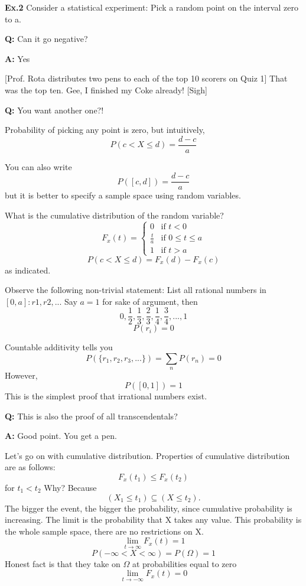 {\bf Ex.2}
Consider a statistical experiment: Pick a random point on the interval
zero to a.

{\bf Q:} Can it go negative?

{\bf A:} Yes

[Prof. Rota distributes two pens to each of the top 10 scorers on Quiz
1]
That was the top ten. Gee, I finished my Coke already! [Sigh]

{\bf Q:} You want another one?!

Probability of picking any point is zero, but intuitively, 
\[ P(c < X \leq d) = \frac{d-c}{a} \]


You can also write \[P([c, d]) = \frac{d-c}{a} \] but it is better to
specify a sample space using random variables.

What is the cumulative distribution of the random variable?
\[ F_{x}(t) = \left\{ \begin{array}{ll} 0 & \mbox{if $t < 0$} \\
\frac{t}{a} & \mbox{if $0 \leq t \leq a $} \\ 1 & \mbox{if $t > a$}
\end{array} \right. \]
\[ P(c < X \leq d) = F_{x}(d) - F_{x}(c)\] as indicated.

Observe the following non-trivial statement:
List all rational numbers in $[0,a]: r1, r2, ...$
Say $a=1$ for sake of argument, then 
\[ 0, \frac{1}{2}, \frac{1}{3}, \frac{2}{3}, \frac{1}{4}, \frac{3}{4},..., 1
\]
\[P(r_{i})=0 \]

Countable additivity tells you \[P(\{r_{1}, r_{2}, r_{3}, ...\}) =
\sum_{n} P(r_{n}) = 0\]
However, \[P([0,1]) = 1\]
This is the simplest proof that irrational numbers exist.

{\bf Q:} This is also the proof of all transcendentals?

{\bf A:} Good point. You get a pen.

Let's go on with cumulative distribution.
Properties of cumulative distribution are as follows: \[F_{x}(t_{1})
\leq F_{x}(t_{2})\]
for $t_{1} < t_{2}$
 Why? Because \[(X_{1} \leq t_{1}) \subseteq (X \leq t_{2}).\]
The bigger the event, the bigger the probability, since cumulative
probability is increasing.
The limit is the probability that X takes any value. This probability is the
whole sample space, there are no restrictions on X.
\[ \lim_{t \rightarrow \infty} F_{x}(t)=1\]  
\[ P(-\infty<X<\infty) = P(\Omega)=1\]
Honest fact is that they take on $\Omega$ at probabilities equal to zero
\[ \lim_{t \rightarrow -\infty} F_{x}(t)=0\]

